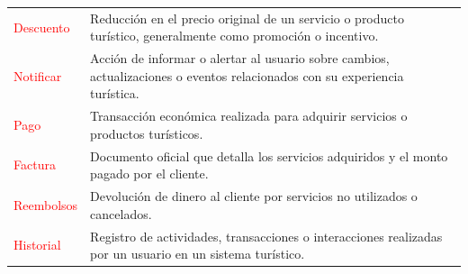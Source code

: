 \newpage
\begin{center}
    \begin{tabular}{p{4cm} p{11cm}}
        \textcolor{red}{Descuento} & Reducción en el precio original de un servicio o producto turístico, generalmente como promoción o incentivo. \\
        \textcolor{red}{Notificar} & Acción de informar o alertar al usuario sobre cambios, actualizaciones o eventos relacionados con su experiencia turística. \\
        \textcolor{red}{Pago} & Transacción económica realizada para adquirir servicios o productos turísticos. \\
        \textcolor{red}{Factura} & Documento oficial que detalla los servicios adquiridos y el monto pagado por el cliente. \\
        \textcolor{red}{Reembolsos} & Devolución de dinero al cliente por servicios no utilizados o cancelados. \\
        \textcolor{red}{Historial} & Registro de actividades, transacciones o interacciones realizadas por un usuario en un sistema turístico. \\
    \end{tabular}
\end{center}
